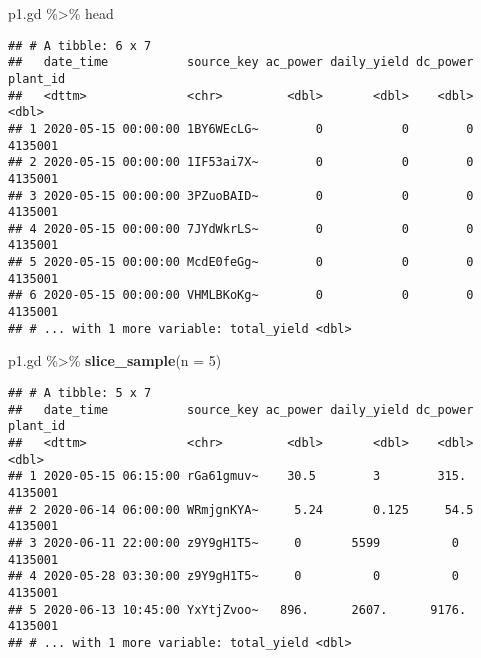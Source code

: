 \documentclass[]{tufte-handout}
\newenvironment{Shaded}{}{}
\newcommand{\CommentTok}[1]{\textcolor[rgb]{0.38,0.63,0.69}{\textit{#1}}}
\newcommand{\DataTypeTok}[1]{\textcolor[rgb]{0.56,0.13,0.00}{#1}}
\newcommand{\DecValTok}[1]{\textcolor[rgb]{0.25,0.63,0.44}{#1}}
\newcommand{\KeywordTok}[1]{\textcolor[rgb]{0.00,0.44,0.13}{\textbf{#1}}}
\newcommand{\NormalTok}[1]{#1}
\newcommand{\OperatorTok}[1]{\textcolor[rgb]{0.40,0.40,0.40}{#1}}
\newcommand{\StringTok}[1]{\textcolor[rgb]{0.25,0.44,0.63}{#1}}
\begin{document}
\begin{Shaded}
\end{Shaded}

\begin{Shaded}
\begin{Highlighting}[]
\NormalTok{p1.gd }\OperatorTok{\%\textgreater{}\%}\StringTok{ }\NormalTok{head}
\end{Highlighting}
\end{Shaded}

\begin{verbatim}
## # A tibble: 6 x 7
##   date_time           source_key ac_power daily_yield dc_power plant_id
##   <dttm>              <chr>         <dbl>       <dbl>    <dbl>    <dbl>
## 1 2020-05-15 00:00:00 1BY6WEcLG~        0           0        0  4135001
## 2 2020-05-15 00:00:00 1IF53ai7X~        0           0        0  4135001
## 3 2020-05-15 00:00:00 3PZuoBAID~        0           0        0  4135001
## 4 2020-05-15 00:00:00 7JYdWkrLS~        0           0        0  4135001
## 5 2020-05-15 00:00:00 McdE0feGg~        0           0        0  4135001
## 6 2020-05-15 00:00:00 VHMLBKoKg~        0           0        0  4135001
## # ... with 1 more variable: total_yield <dbl>
\end{verbatim}

\begin{Shaded}
\begin{Highlighting}[]
\NormalTok{p1.gd }\OperatorTok{\%\textgreater{}\%}\StringTok{ }\KeywordTok{slice\_sample}\NormalTok{(}\DataTypeTok{n =} \DecValTok{5}\NormalTok{)}
\end{Highlighting}
\end{Shaded}

\begin{verbatim}
## # A tibble: 5 x 7
##   date_time           source_key ac_power daily_yield dc_power plant_id
##   <dttm>              <chr>         <dbl>       <dbl>    <dbl>    <dbl>
## 1 2020-05-15 06:15:00 rGa61gmuv~    30.5        3        315.   4135001
## 2 2020-06-14 06:00:00 WRmjgnKYA~     5.24       0.125     54.5  4135001
## 3 2020-06-11 22:00:00 z9Y9gH1T5~     0       5599          0    4135001
## 4 2020-05-28 03:30:00 z9Y9gH1T5~     0          0          0    4135001
## 5 2020-06-13 10:45:00 YxYtjZvoo~   896.      2607.      9176.   4135001
## # ... with 1 more variable: total_yield <dbl>
\end{verbatim}
\end{document}
